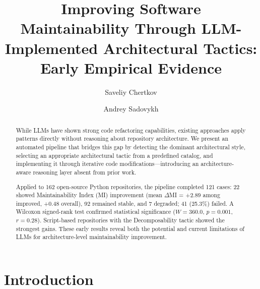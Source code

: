 \documentclass[sigconf,review,anonymous]{acmart}
\begin{document}
\title{Improving Software Maintainability Through LLM-Implemented Architectural Tactics: Early Empirical Evidence}

\author{Saveliy Chertkov}

\author{Andrey Sadovykh}

\begin{abstract}

While LLMs have shown strong code refactoring capabilities, existing approaches apply patterns directly without reasoning about repository architecture. We present an automated pipeline that bridges this gap by detecting the dominant architectural style, selecting an appropriate architectural tactic from a predefined catalog, and implementing it through iterative code modifications---introducing an architecture-aware reasoning layer absent from prior work.

Applied to 162 open-source Python repositories, the pipeline completed 121 cases: 22 showed Maintainability Index (MI) improvement (mean $\Delta$MI = +2.89 among improved, +0.48 overall), 92 remained stable, and 7 degraded; 41 (25.3\%) failed. A Wilcoxon signed-rank test confirmed statistical significance ($W = 360.0$, $p = 0.001$, $r = 0.28$). Script-based repositories with the Decomposability tactic showed the strongest gains. These early results reveal both the potential and current limitations of LLMs for architecture-level maintainability improvement.

\end{abstract}


\maketitle

\section{Introduction}
\end{document}
